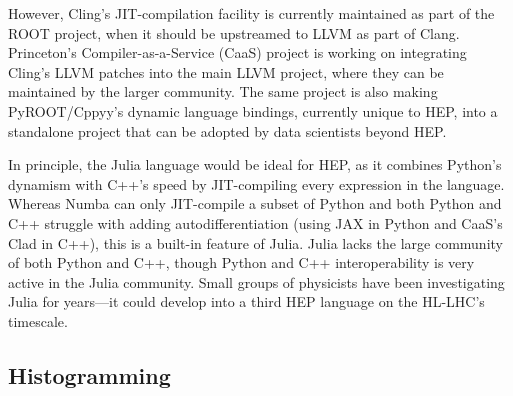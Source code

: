 \documentclass{article}
\begin{document}
However, Cling's JIT-compilation facility is currently maintained as part of the ROOT project, when it should be upstreamed to LLVM as part of Clang. Princeton's Compiler-as-a-Service (CaaS) project is working on integrating Cling's LLVM patches into the main LLVM project, where they can be maintained by the larger community. The same project is also making PyROOT/Cppyy's dynamic language bindings, currently unique to HEP, into a standalone project that can be adopted by data scientists beyond HEP.

In principle, the Julia language would be ideal for HEP, as it combines Python's dynamism with C++'s speed by JIT-compiling every expression in the language. Whereas Numba can only JIT-compile a subset of Python and both Python and C++ struggle with adding autodifferentiation (using JAX in Python and CaaS's Clad in C++), this is a built-in feature of Julia. Julia lacks the large community of both Python and C++, though Python and C++ interoperability is very active in the Julia community. Small groups of physicists have been investigating Julia for years---it could develop into a third HEP language on the HL-LHC's timescale.

\subsection{Histogramming}
\end{document}
